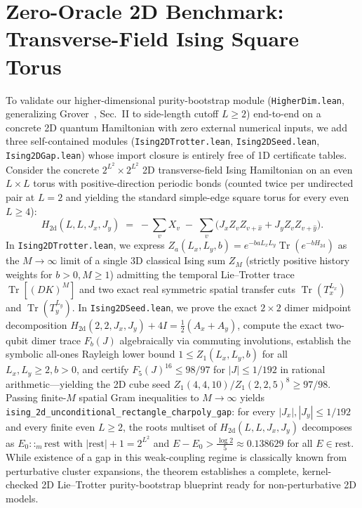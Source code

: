 \documentclass[11pt,a4paper]{article}
\newcommand{\id}[1]{{\small\nolinkurl{#1}}}
\newcommand{\Tr}{\operatorname{Tr}}
\begin{document}
\section{Zero-Oracle 2D Benchmark: Transverse-Field Ising Square Torus}
To validate our higher-dimensional purity-bootstrap module (\id{HigherDim.lean}, generalizing Grover~\cite{grover2026}, Sec.~II to side-length cutoff $L \ge 2$) end-to-end on a concrete 2D quantum Hamiltonian with zero external numerical inputs, we add three self-contained modules (\id{Ising2DTrotter.lean}, \id{Ising2DSeed.lean}, \id{Ising2DGap.lean}) whose import closure is entirely free of 1D certificate tables.
Consider the concrete $2^{L^2} \times 2^{L^2}$ 2D transverse-field Ising Hamiltonian on an even $L \times L$ torus with positive-direction periodic bonds (counted twice per undirected pair at $L = 2$ and yielding the standard simple-edge square torus for every even $L \ge 4$):
\[
  H_{\mathrm{2d}}(L, L, J_x, J_y) \;=\; -\sum_{v} X_v \;-\; \sum_{v} \bigl(J_x Z_v Z_{v+\hat{x}} + J_y Z_v Z_{v+\hat{y}}\bigr).
\]
In \id{Ising2DTrotter.lean}, we express $Z_a(L_x, L_y, b) = e^{-b a L_x L_y} \Tr(e^{-b H_{\mathrm{2d}}})$ as the $M \to \infty$ limit of a single 3D classical Ising sum $Z_M$ (strictly positive history weights for $b > 0, M \ge 1$) admitting the temporal Lie--Trotter trace $\Tr[(DK)^M]$ and two exact real symmetric spatial transfer cuts $\Tr(T_x^{L_x})$ and $\Tr(T_y^{L_y})$.
In \id{Ising2DSeed.lean}, we prove the exact $2 \times 2$ dimer midpoint decomposition $H_{\mathrm{2d}}(2,2,J_x,J_y) + 4I = \frac{1}{2}(A_x + A_y)$, compute the exact two-qubit dimer trace $F_b(J)$ algebraically via commuting involutions, establish the symbolic all-ones Rayleigh lower bound $1 \le Z_1(L_x, L_y, b)$ for all $L_x, L_y \ge 2, b > 0$, and certify $F_5(J)^{16} \le 98/97$ for $|J| \le 1/192$ in rational arithmetic---yielding the 2D cube seed $Z_1(4,4,10)/Z_1(2,2,5)^8 \ge 97/98$.
Passing finite-$M$ spatial Gram inequalities to $M \to \infty$ yields \id{ising_2d_unconditional_rectangle_charpoly_gap}: for every $|J_x|, |J_y| \le 1/192$ and every finite even $L \ge 2$, the roots multiset of $H_{\mathrm{2d}}(L, L, J_x, J_y)$ decomposes as $E_0 ::_m \mathrm{rest}$ with $|\mathrm{rest}| + 1 = 2^{L^2}$ and $E - E_0 > \frac{\log 2}{5} \approx 0.138629$ for all $E \in \mathrm{rest}$.
While existence of a gap in this weak-coupling regime is classically known from perturbative cluster expansions, the theorem establishes a complete, kernel-checked 2D Lie--Trotter purity-bootstrap blueprint ready for non-perturbative 2D models.
\end{document}
